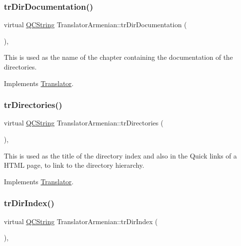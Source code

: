 \subsubsection{\texorpdfstring{trDirDocumentation()}{trDirDocumentation()}}
{\footnotesize\ttfamily virtual \mbox{\hyperlink{class_q_c_string}{Q\+C\+String}} Translator\+Armenian\+::tr\+Dir\+Documentation (\begin{DoxyParamCaption}{ }\end{DoxyParamCaption})\hspace{0.3cm}{\ttfamily [inline]}, {\ttfamily [virtual]}}

This is used as the name of the chapter containing the documentation of the directories. 

Implements \mbox{\hyperlink{class_translator}{Translator}}.

\mbox{\label{class_translator_armenian_aa35445d4b246911285590382d7907abb}} 
\subsubsection{\texorpdfstring{trDirectories()}{trDirectories()}}
{\footnotesize\ttfamily virtual \mbox{\hyperlink{class_q_c_string}{Q\+C\+String}} Translator\+Armenian\+::tr\+Directories (\begin{DoxyParamCaption}{ }\end{DoxyParamCaption})\hspace{0.3cm}{\ttfamily [inline]}, {\ttfamily [virtual]}}

This is used as the title of the directory index and also in the Quick links of a H\+T\+ML page, to link to the directory hierarchy. 

Implements \mbox{\hyperlink{class_translator}{Translator}}.

\mbox{\label{class_translator_armenian_ad3ddaa4084bfe0b2d678017c5b316e7e}} 
\subsubsection{\texorpdfstring{trDirIndex()}{trDirIndex()}}
{\footnotesize\ttfamily virtual \mbox{\hyperlink{class_q_c_string}{Q\+C\+String}} Translator\+Armenian\+::tr\+Dir\+Index (\begin{DoxyParamCaption}{ }\end{DoxyParamCaption})\hspace{0.3cm}{\ttfamily [inline]}, {\ttfamily [virtual]}}

